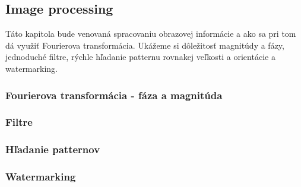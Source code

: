 \subsection{Image processing}

Táto kapitola bude venovaná spracovaniu obrazovej informácie a ako sa
pri tom dá využiť Fourierova transformácia. Ukážeme si dôležitosť
magnitúdy a fázy, jednoduché filtre, rýchle hľadanie patternu rovnakej
veľkosti a orientácie a watermarking.
\subsubsection{Fourierova transformácia - fáza a magnitúda}

\subsubsection{Filtre}

\subsubsection{Hľadanie patternov}

\subsubsection{Watermarking}
